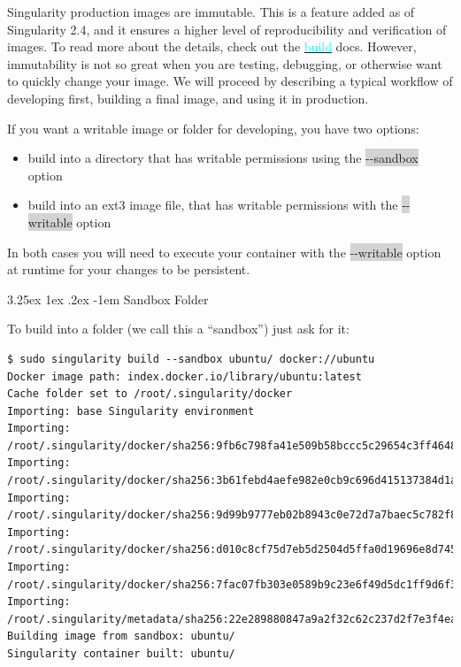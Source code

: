 \documentclass[a4paper]{article}
\makeatletter
\newcounter{subsubsubsection}[subsubsection]
\renewcommand\paragraph{\@startsection{paragraph}{5}{\z@}%
  {3.25ex \@plus1ex \@minus.2ex}%
  {-1em}%
  {\normalfont\normalsize\bfseries}}
\makeatother
\begin{document}
Singularity production images are immutable. This is a feature added as of Singularity 2.4, and it ensures a higher level of reproducibility and verification of images. To read more about the details, check out the \hyperref[sec:buildcontainer]{{\textcolor{cyan}{build}}} docs. However, immutability is not so great when you are testing, debugging, or otherwise want to quickly change your image. We will proceed by describing a typical workflow of developing first, building a final image, and using it in production.

	If you want a writable image or folder for developing, you have two options:
\begin{itemize}
\item build into a directory that has writable permissions using the \colorbox{lightgray}{-{}-sandbox} option
\item build into an ext3 image file, that has writable permissions with the \colorbox{lightgray}{-{}-writable} option
\end{itemize}


In both cases you will need to execute your container with the \colorbox{lightgray}{-{}-writable} option at runtime for your changes to be persistent.

		\paragraph{Sandbox Folder}
		
		To build into a folder (we call this a “sandbox”) just ask for it:\\
	
\begin{lstlisting}[frame=single]  
$ sudo singularity build --sandbox ubuntu/ docker://ubuntu
Docker image path: index.docker.io/library/ubuntu:latest
Cache folder set to /root/.singularity/docker
Importing: base Singularity environment
Importing: /root/.singularity/docker/sha256:9fb6c798fa41e509b58bccc5c29654c3ff4648b608f5daa67c1aab6a7d02c118.tar.gz
Importing: /root/.singularity/docker/sha256:3b61febd4aefe982e0cb9c696d415137384d1a01052b50a85aae46439e15e49a.tar.gz
Importing: /root/.singularity/docker/sha256:9d99b9777eb02b8943c0e72d7a7baec5c782f8fd976825c9d3fb48b3101aacc2.tar.gz
Importing: /root/.singularity/docker/sha256:d010c8cf75d7eb5d2504d5ffa0d19696e8d745a457dd8d28ec6dd41d3763617e.tar.gz
Importing: /root/.singularity/docker/sha256:7fac07fb303e0589b9c23e6f49d5dc1ff9d6f3c8c88cabe768b430bdb47f03a9.tar.gz
Importing: /root/.singularity/metadata/sha256:22e289880847a9a2f32c62c237d2f7e3f4eae7259bf1d5c7ec7ffa19c1a483c8.tar.gz
Building image from sandbox: ubuntu/
Singularity container built: ubuntu/
\end{lstlisting}
\end{document}
